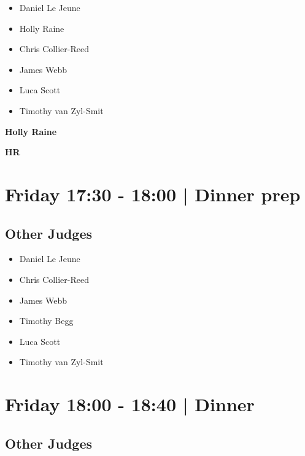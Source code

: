 \documentclass[10pt]{article}
\newcommand{\newtitle}[1]{\begin{center}{\Huge\bfseries #1 }\\ \vspace{5mm}\end{center}}
\newcommand{\newsubtitle}[1]{\begin{center}{\color{grey}\Large\bfseries #1 }\\ \vspace{5mm}\end{center}}
\begin{document}
            \begin{itemize}
                            \item Daniel Le Jeune
                            \item Holly Raine
                            \item Chris Collier-Reed
                            \item James Webb
                            \item Luca Scott
                            \item Timothy van Zyl-Smit
                        \end{itemize}
        

    
	\clearpage

		\newtitle{Holly Raine}
	\newsubtitle{HR}

            \section*{Friday 17:30
        -
        18:00
        |
         Dinner prep}
        
                
        \subsection*{Other Judges}
        
            \begin{itemize}
                            \item Daniel Le Jeune
                            \item Chris Collier-Reed
                            \item James Webb
                            \item Timothy Begg
                            \item Luca Scott
                            \item Timothy van Zyl-Smit
                        \end{itemize}
        

            \section*{Friday 18:00
        -
        18:40
        |
         Dinner }
        
                
        \subsection*{Other Judges}
        
\end{document}
